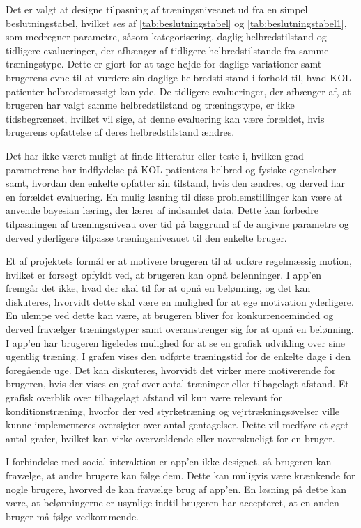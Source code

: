 Det er valgt at designe tilpasning af træningsniveauet ud fra en simpel beslutningstabel, hvilket ses af \autoref{tab:beslutningstabel} og \autoref{tab:beslutningstabel1}, som medregner parametre, såsom kategorisering, daglig helbredstilstand og tidligere evalueringer, der afhænger af tidligere helbredstilstande fra samme træningstype. Dette er gjort for at tage højde for daglige variationer samt brugerens evne til at vurdere sin daglige helbredstilstand i forhold til, hvad KOL-patienter helbredsmæssigt kan yde. De tidligere evalueringer, der afhænger af, at brugeren har valgt samme helbredstilstand og træningstype, er ikke tidsbegrænset, hvilket vil sige, at denne evaluering kan være forældet, hvis brugerens opfattelse af deres helbredstilstand ændres.

Det har ikke været muligt at finde litteratur eller teste i, hvilken grad parametrene har indflydelse på KOL-patienters helbred og fysiske egenskaber samt, hvordan den enkelte opfatter sin tilstand, hvis den ændres, og derved har en forældet evaluering. En mulig løsning til disse problemstillinger kan være at anvende bayesian læring, der lærer af indsamlet data. Dette kan forbedre tilpasningen af træningsniveau over tid på baggrund af de angivne parametre og derved yderligere tilpasse træningsniveauet til den enkelte bruger. 

Et af projektets formål er at motivere brugeren til at udføre regelmæssig motion, hvilket er forsøgt opfyldt ved, at brugeren kan opnå belønninger. I app’en fremgår det ikke, hvad der skal til for at opnå en belønning, og det kan diskuteres, hvorvidt dette skal være en mulighed for at øge motivation yderligere. En ulempe ved dette kan være, at brugeren bliver for konkurrenceminded og derved fravælger træningstyper samt overanstrenger sig for at opnå en belønning. I app'en har brugeren ligeledes mulighed for at se en grafisk udvikling over sine ugentlig træning. I grafen vises den udførte træningstid for de enkelte dage i den foregående uge. Det kan diskuteres, hvorvidt det virker mere motiverende for brugeren, hvis der vises en graf over antal træninger eller tilbagelagt afstand. Et grafisk overblik over tilbagelagt afstand vil kun være relevant for konditionstræning, hvorfor der ved styrketræning og vejrtrækningsøvelser ville kunne implementeres oversigter over antal gentagelser. Dette vil medføre et øget antal grafer, hvilket kan virke overvældende eller uoverskueligt for en bruger.

I forbindelse med social interaktion er app’en ikke designet, så brugeren kan fravælge, at andre brugere kan følge dem. Dette kan muligvis være krænkende  for nogle brugere, hvorved de kan fravælge brug af app’en. En løsning på dette kan være, at belønningerne er usynlige indtil brugeren har accepteret, at en anden bruger må følge vedkommende.

